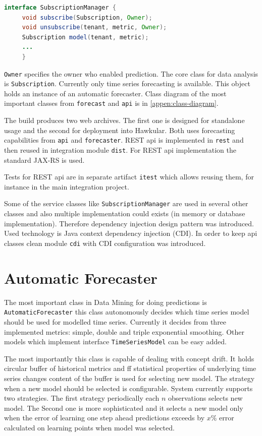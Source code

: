     \begin{lstlisting}[caption={Interface \texttt{SubscriptionManager}.}, language=Java, label={alg:sub-manager}]
interface SubscriptionManager {
     void subscribe(Subscription, Owner);
     void unsubscribe(tenant, metric, Owner);
     Subscription model(tenant, metric);
     ...
     }
    \end{lstlisting}

    \texttt{Owner} specifies the owner who enabled prediction. The core class for data analysis is
    \texttt{Subscription}. Currently only time series forecasting is available.
    This object holds an instance of an automatic forecaster. Class diagram of the most important classes
    from \texttt{forecast} and \texttt{api} is in \ref{appen:class-diagram}.

    The build produces two web archives. The first one is designed for standalone usage and the second for deployment
    into Hawkular. Both uses forecasting capabilities from \texttt{api} and \texttt{forecaster}.
    REST api is implemented in \texttt{rest} and then reused in integration module \texttt{dist}.
    For REST api implementation the standard JAX-RS is used.

    Tests for REST api are in separate artifact \texttt{itest} which allows reusing them, for instance in the main
    integration project.

    Some of the service classes like \texttt{SubscriptionManager} are used in several other classes and also multiple
    implementation could exists (in memory or database implementation). Therefore dependency injection
    design pattern was introduced. Used technology is Java context dependency injection (CDI). In order to keep
    api classes clean module \texttt{cdi} with CDI configuration was introduced.

    \section{Automatic Forecaster}
    The most important class in Data Mining for doing predictions is \texttt{AutomaticForecaster} this class
    autonomously decides which time series model should be used for modelled time series. Currently it decides from
    three implemented metrics: simple, double and triple exponential smoothing. Other models which implement interface
    \texttt{TimeSeriesModel} can be easy added.

    The most importantly this class is capable of dealing with concept drift. It holds circular buffer of historical
    metrics and ff statistical properties of underlying time series changes content of the buffer is used for selecting
    new model. The strategy when a new model should be selected is configurable. System currently supports two
    strategies. The first strategy periodically each $n$ observations selects new model.
    The Second one is more sophisticated and it selects a new model only when the error of learning one step
    ahead predictions exceeds by $x\%$ error calculated on learning points when model was selected.


